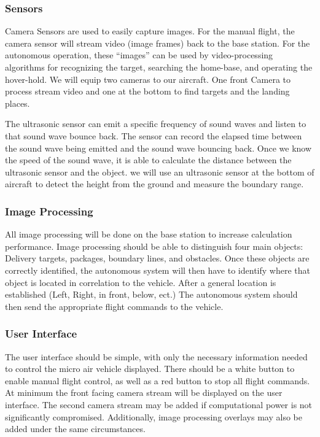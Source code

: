 \documentclass[onecolumn, draftclsnofoot,10pt, compsoc]{IEEEtran}
\begin{document}
\subsubsection{Sensors}%

Camera Sensors are used to easily capture images. For the manual flight, the camera sensor will stream video (image frames) back to the base station. For the autonomous operation, these “images” can be used by video-processing algorithms for recognizing the target, searching the home-base, and operating the hover-hold. We will equip two cameras to our aircraft. One front Camera to process stream video and one at the bottom to find targets and the landing places.


The ultrasonic sensor can emit a specific frequency of sound waves and listen to that sound wave bounce back. The sensor can record the elapsed time between the sound wave being emitted and the sound wave bouncing back\cite{r11}. Once we know the speed of the sound wave, it is able to calculate the distance between the ultrasonic sensor and the object. we will use an ultrasonic sensor at the bottom of aircraft to detect the height from the ground and measure the boundary range.


\subsubsection{Image Processing}

All image processing will be done on the base station to increase calculation performance. Image processing should be able to distinguish four main objects: Delivery targets, packages, boundary lines, and obstacles. Once these objects are correctly identified, the autonomous system will then have to identify where that object is located in correlation to the vehicle. After a general location is established (Left, Right, in front, below, ect.) The autonomous system should then send the appropriate flight commands to the vehicle. 

\subsubsection{User Interface}

The user interface should be simple, with only the necessary information needed to control the micro air vehicle displayed. There should be a white button to enable manual flight control, as well as a red button to stop all flight commands. At minimum the front facing camera stream will be displayed on the user interface. The second camera stream may be added if computational power is not significantly compromised. Additionally, image processing overlays may also be added under the same circumstances. 
\end{document}
